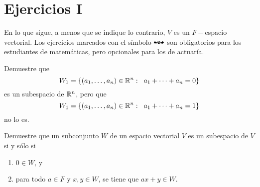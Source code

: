 \section{Ejercicios I}
En lo que sigue, a menos que se indique lo contrario,
$V$ es un $F-$espacio vectorial.
Los ejercicios marcados con el símbolo
$\mathbat$ son obligatorios para los estudiantes de matemáticas,
pero opcionales para los de actuaría.

\begin{ej}
    Demuestre que
    \[
    W_{1} = \{ (a_{1}, \ldots , a_{n}) \in \mathbb{R}^{n} : \hspace{0.2cm} 
    a_{1} + \cdots + a_{n} = 0\}
    \]
    es un subespacio de $\mathbb{R}^{n}$, pero que 
    \[
    W_{1} = \{ (a_{1}, \ldots , a_{n}) \in \mathbb{R}^{n} : \hspace{0.2cm} 
    a_{1} + \cdots + a_{n} = 1\}
    \]
    no lo es.
\end{ej}

\begin{ej}
    Demuestre que un subconjunto $W$ de un espacio vectorial $V$
    es un subespacio de $V$ si y sólo si
    \begin{enumerate}
        \item $0 \in W$, y
        \item para todo $a \in F$ y $x, y \in W$, se tiene que
        $ax + y \in W$.
    \end{enumerate}
\end{ej}

